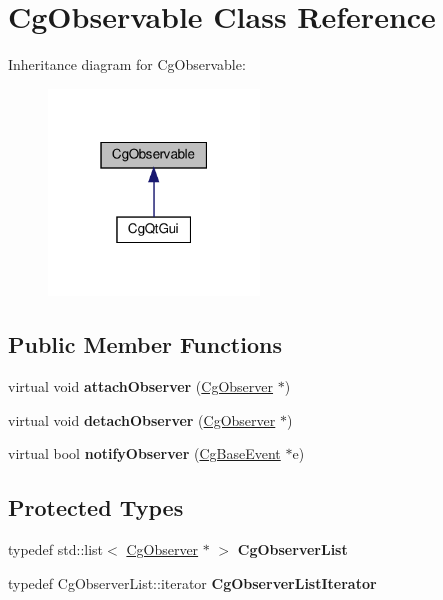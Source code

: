\hypertarget{class_cg_observable}{}\section{Cg\+Observable Class Reference}
\label{class_cg_observable}


Inheritance diagram for Cg\+Observable\+:
\nopagebreak
\begin{figure}[H]
\begin{center}
\leavevmode
\includegraphics[width=159pt]{class_cg_observable__inherit__graph}
\end{center}
\end{figure}
\subsection*{Public Member Functions}
\begin{DoxyCompactItemize}
\item 
\mbox{\label{class_cg_observable_aa2a6c334ca62dec6257fd1e222ee7888}} 
virtual void {\bfseries attach\+Observer} (\hyperlink{class_cg_observer}{Cg\+Observer} $\ast$)
\item 
\mbox{\label{class_cg_observable_aa839f3551b700db641e6e21c2456e2fd}} 
virtual void {\bfseries detach\+Observer} (\hyperlink{class_cg_observer}{Cg\+Observer} $\ast$)
\item 
\mbox{\label{class_cg_observable_ab7e4a440249c3db38c3122951206dfaf}} 
virtual bool {\bfseries notify\+Observer} (\hyperlink{class_cg_base_event}{Cg\+Base\+Event} $\ast$e)
\end{DoxyCompactItemize}
\subsection*{Protected Types}
\begin{DoxyCompactItemize}
\item 
\mbox{\label{class_cg_observable_a966c422e2dff169b76f90dd45fd367b6}} 
typedef std\+::list$<$ \hyperlink{class_cg_observer}{Cg\+Observer} $\ast$ $>$ {\bfseries Cg\+Observer\+List}
\item 
\mbox{\label{class_cg_observable_af8fd10d5fa175fdfc3b9483c216937c1}} 
typedef Cg\+Observer\+List\+::iterator {\bfseries Cg\+Observer\+List\+Iterator}
\end{DoxyCompactItemize}
